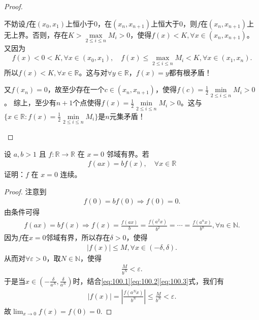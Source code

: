 \documentclass[../../main.tex]{subfiles}%
\begin{document}
\begin{proof}
\begin{enumerate}
不妨设\(f\)在\(( x_0,x_1 )\)上恒小于\(0\)，在\(( x_n,x_{n + 1} )\)上恒大于\(0\)，则\(f\)在\(( x_n,x_{n + 1} )\)上无上界。否则，存在\(K>\underset{2\leqslant  i\leqslant  n}{\max}M_i>0\)，使得\(f( x ) <K,\forall x\in ( x_n,x_{n + 1} )\)。又因为
\begin{align*}
f( x ) <0<K,\forall x\in ( x_0,x_1 ),\quad f( x ) \leqslant \underset{2\leqslant  i\leqslant  n}{\max}M_i<K,\forall x\in ( x_1,x_n ).
\end{align*}
所以\(f( x ) <K,\forall x\in \mathbb{R} \)。这与对\(\forall y\in \mathbb{R} \)，\(f( x ) =y\)都有根矛盾！

又\(f( x_n ) =0\)，故至少存在一个\(c\in ( x_n,x_{n + 1} )\)，使得\(f( c ) =\frac{1}{2}\underset{2\leqslant  i\leqslant  n}{\min}M_i>0\)。
综上，至少有\(n + 1\)个点使得\(f( x ) =\frac{1}{2}\underset{2\leqslant  i\leqslant  n}{\min}M_i>0\)。这与\(\{ x\in \mathbb{R} :f( x ) =\frac{1}{2}\underset{2\leqslant  i\leqslant  n}{\min}M_i \}\)是\(n\)元集矛盾！
\end{enumerate}

\end{proof}

\begin{example}
设 \(a,b > 1\) 且 \(f: \mathbb{R} \to \mathbb{R}\) 在 \(x = 0\) 邻域有界。若
\begin{align*}
f(ax) = bf(x),\quad \forall x \in \mathbb{R}
\end{align*}
证明：\(f\) 在 \(x = 0\) 连续。 
\end{example}
\begin{proof}

注意到
\begin{align*}
f(0) = bf(0) \Rightarrow f(0) = 0.
\end{align*}
由条件可得
\begin{align}
f(ax) = bf(x) \Rightarrow f(x) = \frac{f(ax)}{b} = \frac{f(a^2x)}{b^2} = \cdots = \frac{f(a^nx)}{b^n}, \forall n \in \mathbb{N}. \label{eq:100.1}
\end{align}
因为\(f\)在\(x=0\)邻域有界，所以存在\(\delta > 0\)，使得
\begin{align}
|f(x)| \leqslant M, \forall x \in (-\delta, \delta). \label{eq:100.2}
\end{align}
从而对\(\forall \varepsilon > 0\)，取\(N \in \mathbb{N}\)，使得
\begin{align}
\frac{M}{b^N} < \varepsilon. \label{eq:100.3}
\end{align}
于是当\(x \in \left( -\frac{\delta}{a^N}, \frac{\delta}{a^N} \right)\)时，结合\eqref{eq:100.1}\eqref{eq:100.2}\eqref{eq:100.3}式，我们有
\begin{align*}
|f(x)| = \left| \frac{f(a^Nx)}{b^N} \right| \leqslant \frac{M}{b^N} < \varepsilon.
\end{align*}
故\(\lim_{x \to 0} f(x) = f(0) = 0.\)

\end{proof}
\end{document}

